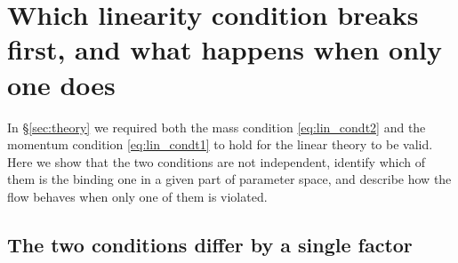 \documentclass[trackchanges,twocolumn]{aastex7}
\begin{document}
\appendix

\section{Which linearity condition breaks first, and what happens when only one does}
\label{sec:app_linearity}

In \S\ref{sec:theory} we required both the mass condition \eqref{eq:lin_condt2} and the
momentum condition \eqref{eq:lin_condt1} to hold for the linear theory to be valid. Here we
show that the two conditions are not independent, identify which of them is the binding one
in a given part of parameter space, and describe how the flow behaves when only one of them
is violated.

\subsection{The two conditions differ by a single factor}
\label{sec:app_ratio}
\end{document}
